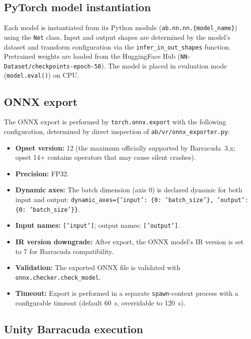 \documentclass[10pt,twocolumn,letterpaper]{article}
\begin{document}
\subsection{PyTorch model instantiation}

Each model is instantiated from its Python module (\texttt{ab.nn.nn.\{model\_name\}}) using the \texttt{Net} class. Input and output shapes are determined by the model's dataset and transform configuration via the \texttt{infer\_in\_out\_shapes} function. Pretrained weights are loaded from the HuggingFace Hub (\texttt{NN-Dataset/checkpoints-epoch-50}). The model is placed in evaluation mode (\texttt{model.eval()}) on CPU.

\subsection{ONNX export}

The ONNX export is performed by \texttt{torch.onnx.export} with the following configuration, determined by direct inspection of \texttt{ab/vr/onnx\_exporter.py}:

\begin{itemize}[nosep,leftmargin=*]
  \item \textbf{Opset version:} 12 (the maximum officially supported by Barracuda~3.x; opset 14+ contains operators that may cause silent crashes).
  \item \textbf{Precision:} FP32.
  \item \textbf{Dynamic axes:} The batch dimension (axis 0) is declared dynamic for both input and output: \texttt{dynamic\_axes=\{'input': \{0: 'batch\_size'\}, 'output': \{0: 'batch\_size'\}\}}.
  \item \textbf{Input names:} \texttt{['input']}; output names: \texttt{['output']}.
  \item \textbf{IR version downgrade:} After export, the ONNX model's IR version is set to 7 for Barracuda compatibility.
  \item \textbf{Validation:} The exported ONNX file is validated with \texttt{onnx.checker.check\_model}.
  \item \textbf{Timeout:} Export is performed in a separate \texttt{spawn}-context process with a configurable timeout (default 60~s, overridable to 120~s).
\end{itemize}

\subsection{Unity Barracuda execution}
\end{document}
